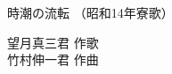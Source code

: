 \documentclass[10pt,b5j]{tarticle} %
\begin{document}
\begin{minipage}[c]{0.7\hsize} %
    \begin{center}
        {\LARGE
            時潮の流転 %
        }
        {\small 
            （昭和14年寮歌） %
        }
    \end{center}
\end{minipage}
\begin{minipage}[c]{0.3\hsize} %
    \begin{flushright} %
        望月真三君 作歌\\竹村伸一君 作曲 %
    \end{flushright}
\end{minipage}
\end{document}
